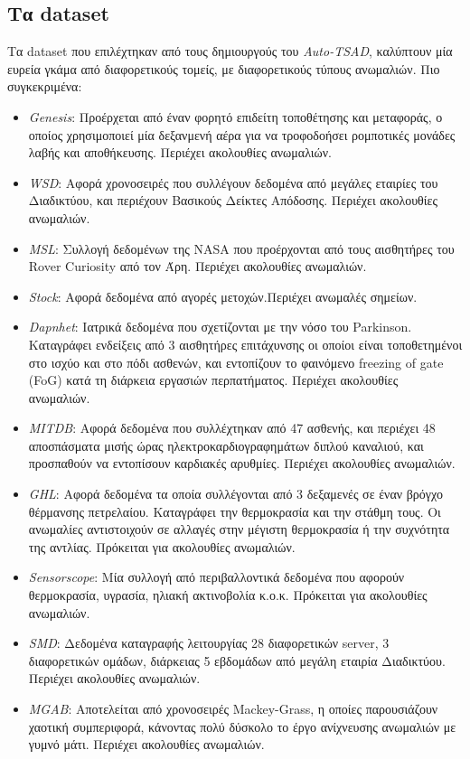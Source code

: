 \subsection{Τα dataset}
Τα dataset που επιλέχτηκαν από τους δημιουργούς του \emph{Auto-TSAD}, καλύπτουν μία ευρεία γκάμα από διαφορετικούς τομείς, με διαφορετικούς τύπους ανωμαλιών. Πιο συγκεκριμένα:
\begin{itemize}
    \item \emph{Genesis}: Προέρχεται από έναν φορητό επιδείτη τοποθέτησης και μεταφοράς, ο οποίος χρησιμοποιεί μία δεξανμενή αέρα για να τροφοδοήσει ρομποτικές μονάδες λαβής και αποθήκευσης. Περιέχει ακολουθίες ανωμαλιών.
    \item \emph{WSD}: Αφορά χρονοσειρές που συλλέγουν δεδομένα από μεγάλες εταιρίες του Διαδικτύου, και περιέχουν Βασικούς Δείκτες Απόδοσης. Περιέχει ακολουθίες ανωμαλιών.
    \item \emph{MSL}: Συλλογή δεδομένων της NASA που προέρχονται από τους αισθητήρες του Rover Curiosity από τον Άρη. Περιέχει ακολουθίες ανωμαλιών.
    \item \emph{Stock}: Αφορά δεδομένα από αγορές μετοχών.Περιέχει ανωμαλές σημείων.
    \item \emph{Dapnhet}: Ιατρικά δεδομένα που σχετίζονται με την νόσο του Parkinson. Καταγράφει ενδείξεις από 3 αισθητήρες επιτάχυνσης οι οποίοι είναι τοποθετημένοι στο ισχύο και στο πόδι ασθενών, και εντοπίζουν το φαινόμενο freezing of gate (FoG) κατά τη διάρκεια εργασιών περπατήματος. Περιέχει ακολουθίες ανωμαλιών.
    \item \emph{MITDB}: Αφορά δεδομένα που συλλέχτηκαν από 47 ασθενής, και περιέχει 48 αποσπάσματα μισής ώρας ηλεκτροκαρδιογραφημάτων διπλού καναλιού, και προσπαθούν να εντοπίσουν καρδιακές αρυθμίες. Περιέχει ακολουθίες ανωμαλιών.
    \item \emph{GHL}: Αφορά δεδομένα τα οποία συλλέγονται από 3 δεξαμενές σε έναν βρόγχο θέρμανσης πετρελαίου. Καταγράφει την θερμοκρασία και την στάθμη τους. Οι ανωμαλίες αντιστοιχούν σε αλλαγές στην μέγιστη θερμοκρασία ή την συχνότητα της αντλίας. Πρόκειται για ακολουθίες ανωμαλιών.
    \item \emph{Sensorscope}: Μία συλλογή από περιβαλλοντικά δεδομένα που αφορούν θερμοκρασία, υγρασία, ηλιακή ακτινοβολία κ.ο.κ. Πρόκειται για ακολουθίες ανωμαλιών.
    \item \emph{SMD}: Δεδομένα καταγραφής λειτουργίας 28 διαφορετικών server, 3 διαφορετικών ομάδων, διάρκειας 5 εβδομάδων από μεγάλη εταιρία Διαδικτύου. Περιέχει ακολουθίες ανωμαλιών.
    \item \emph{MGAB}: Αποτελείται από χρονοσειρές Mackey-Grass, η οποίες παρουσιάζουν χαοτική συμπεριφορά, κάνοντας πολύ δύσκολο το έργο ανίχνευσης ανωμαλιών με γυμνό μάτι. Περιέχει ακολουθίες ανωμαλιών.

\end{itemize}
